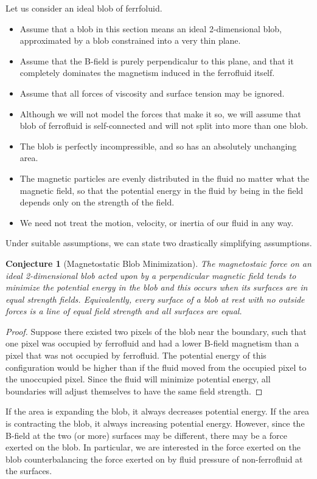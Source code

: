 \documentclass{asme2ej}
\newtheorem{conjecture}{Conjecture}
\begin{document}
Let us consider an ideal blob of ferrfoluid.
\begin{itemize}
\item Assume that a blob in this section means an ideal 2-dimensional blob,
approximated by a blob constrained into a very thin plane.
\item Assume that the B-field is purely perpendicalur to this plane,
and that it completely dominates the magnetism induced in
the ferrofluid itself.
\item Assume that all forces of viscosity and surface tension may
  be ignored.
\item Although we will not model the forces that make it so,
  we will assume that blob of ferrofluid is self-connected and
  will not split into more than one blob.
\item The blob is perfectly incompressible, and so
  has an absolutely unchanging area.
\item The magnetic particles are evenly distributed in the
  fluid no matter what the magnetic field, so that the potential
  energy in the fluid by being in the field depends only on the
  strength of the field.
\item We need not treat the motion, velocity, or inertia of
  our fluid in any way.
\end{itemize}
Under suitable assumptions, we can state two drastically
simplifying assumptions.

\begin{conjecture}[Magnetostatic Blob Minimization]
  \label{conj:mbf1}
  The magnetostaic force on an ideal 2-dimensional blob
  acted upon by a perpendicular magnetic field
  tends to minimize the potential energy in the blob
  and this occurs when its surfaces are in equal strength fields.
  Equivalently, every surface of a blob at rest with no outside
  forces is a line of equal field strength and all surfaces are equal.
\end{conjecture}


\begin{proof}
  Suppose there existed two pixels of the blob near the boundary,
  such that one pixel was occupied by ferrofluid and had a lower
  B-field magnetism than a pixel that was not occupied by ferrofluid.
  The potential energy of this configuration would be higher than
  if the fluid moved from the occupied pixel to the unoccupied pixel.
  Since the fluid will minimize potential energy, all boundaries
  will adjust themselves to have the same field strength.
  \end{proof}
If the area is expanding the blob, it always decreases potential
energy. If the area is contracting the blob, it always increasing
potential energy. However, since the B-field at the two (or more)
surfaces may be different, there may be a force exerted on the
blob. In particular, we are interested in the force exerted on
the blob counterbalancing the force exerted on by fluid pressure
of non-ferrofluid at the surfaces.
\end{document}
